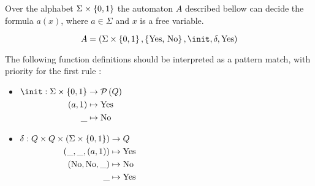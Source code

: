 \documentclass{article}
\begin{document}
\begin{lemma}
	Over the alphabet $\Sigma \times \left\{0,1\right\}$ the automaton $A$ described bellow can decide the formula $a (x)$,
	where $a \in \Sigma$ and $x$ is a free variable.

	\[A =   (\Sigma \times \set {0,1}, \set {\text {Yes, No}} ,  \init, \delta, \text{Yes})  \]

	The following function definitions should be interpreted as a pattern match, with priority for the first rule :

	\begin{itemize}
		\item $\begin{aligned}[t]
				      \init      : \Sigma \times \set{0,1} & \to \parts Q       \\
				      (a, 1)                               & \mapsto \text{Yes} \\
				      \_                                   & \mapsto \text{No}
			      \end{aligned} $

		\item $\begin{aligned}[t]
				      \delta               : Q \times Q \times (\Sigma \times \left\{0,1\right\}) & \to Q              \\
				      (\_, \_, (a,1))                                                     & \mapsto \text{Yes} \\
				      (\text{No}, \text{No},  \_)                                         & \mapsto \text{No}  \\
				      \_                                                                  & \mapsto \text{Yes}
			      \end{aligned}$
	\end{itemize}
\end{lemma}
\end{document}

